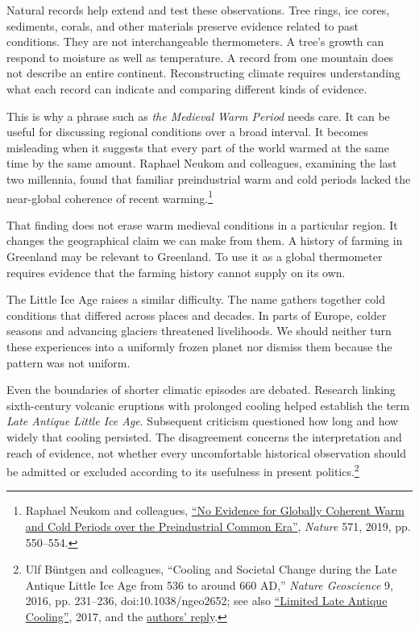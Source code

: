\documentclass[12pt,a4paper]{book}
\begin{document}
Natural records help extend and test these observations. Tree rings, ice cores, sediments, corals, and other materials preserve evidence related to past conditions. They are not interchangeable thermometers. A tree's growth can respond to moisture as well as temperature. A record from one mountain does not describe an entire continent. Reconstructing climate requires understanding what each record can indicate and comparing different kinds of evidence.

This is why a phrase such as \emph{the Medieval Warm Period} needs care. It can be useful for discussing regional conditions over a broad interval. It becomes misleading when it suggests that every part of the world warmed at the same time by the same amount. Raphael Neukom and colleagues, examining the last two millennia, found that familiar preindustrial warm and cold periods lacked the near-global coherence of recent warming.\footnote{Raphael Neukom and colleagues, \href{https://doi.org/10.1038/s41586-019-1401-2}{``No Evidence for Globally Coherent Warm and Cold Periods over the Preindustrial Common Era''}, \emph{Nature} 571, 2019, pp. 550--554.}

That finding does not erase warm medieval conditions in a particular region. It changes the geographical claim we can make from them. A history of farming in Greenland may be relevant to Greenland. To use it as a global thermometer requires evidence that the farming history cannot supply on its own.

The Little Ice Age raises a similar difficulty. The name gathers together cold conditions that differed across places and decades. In parts of Europe, colder seasons and advancing glaciers threatened livelihoods. We should neither turn these experiences into a uniformly frozen planet nor dismiss them because the pattern was not uniform.

Even the boundaries of shorter climatic episodes are debated. Research linking sixth-century volcanic eruptions with prolonged cooling helped establish the term \emph{Late Antique Little Ice Age}. Subsequent criticism questioned how long and how widely that cooling persisted. The disagreement concerns the interpretation and reach of evidence, not whether every uncomfortable historical observation should be admitted or excluded according to its usefulness in present politics.\footnote{Ulf Büntgen and colleagues, ``Cooling and Societal Change during the Late Antique Little Ice Age from 536 to around 660 AD,'' \emph{Nature Geoscience} 9, 2016, pp. 231--236, doi:10.1038/ngeo2652; see also \href{https://www.nature.com/articles/ngeo2926}{``Limited Late Antique Cooling''}, 2017, and the \href{https://www.nature.com/articles/ngeo2927}{authors' reply}.}
\end{document}
